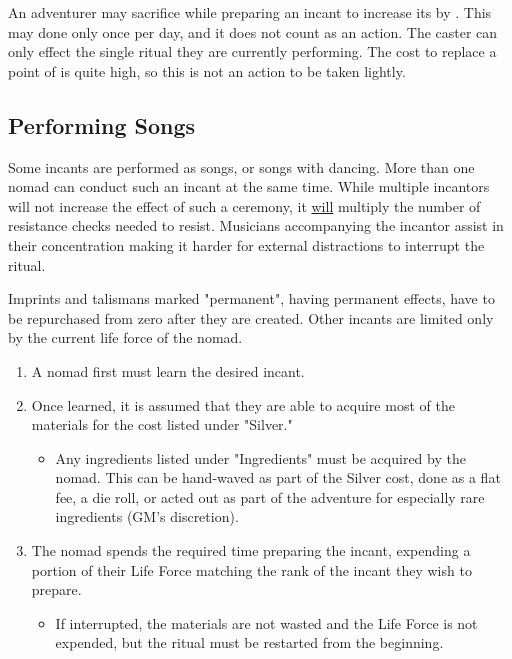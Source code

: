 \begin{multicols*}{2}
An adventurer may sacrifice \tcdefine{1 \HEA} while preparing an incant to increase its  by . This may done only once per day, and it does not count as an action. The caster can only effect the single ritual they are currently performing. The cost to replace a point of \HEA is quite high, so this is not an action to be taken lightly.

\subsection{Performing Songs}

Some incants are performed as songs, or songs with dancing. More than one nomad can conduct such an incant at the same time. While multiple incantors will not increase the effect of such a ceremony, it \ul{will} multiply the number of resistance checks needed to resist. Musicians accompanying the incantor assist in their concentration making it harder for external distractions to interrupt the ritual.


Imprints and talismans marked "permanent", having permanent effects, have to be repurchased from zero after they are created. Other incants are limited only by the current life force of the nomad.\\

\begin{normboxlist}
\begin{enumerate}
\item A nomad first must learn the desired incant.
\item Once learned, it is assumed that they are able to acquire most of the materials for the cost listed under "Silver."
\begin{itemize}
\item[] Any ingredients listed under "Ingredients" must be acquired by the nomad. This can be hand-waved as part of the Silver cost, done as a flat fee, a die roll, or acted out as part of the adventure for especially rare ingredients (GM's discretion). 
\end{itemize}
\item The nomad spends the required time preparing the incant, expending a portion of their Life Force matching the rank of the incant they wish to prepare.
\begin{itemize}
\item[] If interrupted, the materials are not wasted and the Life Force is not expended, but the ritual must be restarted from the beginning.
\end{itemize}
\end{enumerate}
\end{normboxlist}


\end{multicols*}

